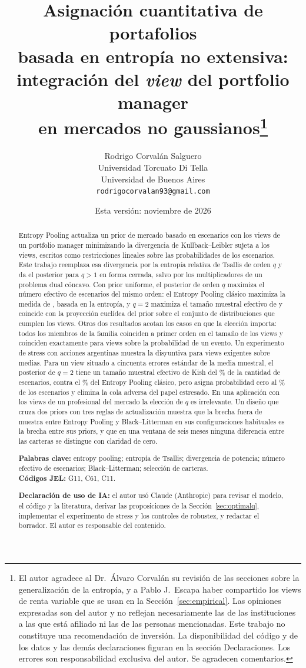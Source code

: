 \documentclass[11pt]{article}
\title{\vspace{-1.9cm}\textbf{Asignaci\'on cuantitativa de portafolios\\ basada en entrop\'ia no extensiva:\\ integraci\'on del \emph{view} del portfolio manager\\ en mercados no gaussianos}\thanks{El autor agradece al Dr.~\'Alvaro Corval\'an su revisi\'on de las secciones sobre la generalizaci\'on de la entrop\'ia, y a Pablo J.~Escapa haber compartido los views de renta variable que se usan en la Secci\'on~\ref{sec:empirical}. Las opiniones expresadas son del autor y no reflejan necesariamente las de las instituciones a las que est\'a afiliado ni las de las personas mencionadas. Este trabajo no constituye una recomendaci\'on de inversi\'on. La disponibilidad del c\'odigo y de los datos y las dem\'as declaraciones figuran en la secci\'on Declaraciones. Los errores son responsabilidad exclusiva del autor. Se agradecen comentarios.}}
\author{Rodrigo Corval\'an Salguero\\ \small Universidad Torcuato Di Tella\\ \small Universidad de Buenos Aires\\ \small \texttt{rodrigocorvalan93@gmail.com}}
\date{Esta versi\'on: noviembre de 2026}
\begin{document}
\maketitle

\begin{abstract}
\noindent
Entropy Pooling \citep{Meucci2008} actualiza un prior de mercado basado en
escenarios con los views de un portfolio manager minimizando la divergencia
de Kullback--Leibler sujeta a los views, escritos como restricciones
lineales sobre las probabilidades de los escenarios. Este trabajo reemplaza
esa divergencia por la entrop\'ia relativa de Tsallis de orden $q$ y da
el posterior para $q>1$ en forma cerrada, salvo por los multiplicadores de un
problema dual c\'oncavo. Con prior uniforme, el
posterior de orden $q$ maximiza el n\'umero efectivo de escenarios del mismo
orden: el Entropy Pooling cl\'asico maximiza la medida de \citet{Meucci2012}, basada en
la entrop\'ia, y $q=2$ maximiza el tama\~no muestral efectivo de
\citet{Kish1965} y coincide con la proyecci\'on eucl\'idea del prior sobre el
conjunto de distribuciones que cumplen los views. Otros dos resultados
acotan los casos en que la elecci\'on importa: todos los miembros de la familia
coinciden a primer orden en el tama\~no de los views y coinciden exactamente
para views sobre la probabilidad de un evento. Un experimento de stress con
acciones argentinas muestra la disyuntiva para views exigentes sobre
medias. Para un view situado a cincuenta errores est\'andar de la media
muestral, el posterior de $q=2$ tiene un tama\~no muestral efectivo de Kish del
\nKishTFiftyPct\% de la cantidad de escenarios, contra el
\nKishSFiftyPct\% del Entropy Pooling cl\'asico, pero
asigna probabilidad cero al \nZerosFiftyPct\% de los escenarios y elimina la
cola adversa del papel estresado. En una aplicaci\'on con los views de un
profesional del mercado la elecci\'on de $q$ es irrelevante. Un dise\~no que
cruza dos priors con tres reglas de actualizaci\'on muestra que la brecha
fuera de muestra entre Entropy Pooling y Black--Litterman en sus
configuraciones habituales es la brecha entre sus priors, y que en una
ventana de seis meses ninguna diferencia entre las carteras se distingue
con claridad de cero.
\medskip

\noindent\textbf{Palabras clave:} entropy pooling; entrop\'ia de Tsallis;
divergencia de potencia; n\'umero efectivo de escenarios; Black--Litterman;
selecci\'on de carteras.\\
\textbf{C\'odigos JEL:} G11, C61, C11.
\medskip

\noindent\textbf{Declaraci\'on de uso de IA:} el autor us\'o Claude
(Anthropic) para revisar el modelo, el c\'odigo y la literatura, derivar las
proposiciones de la Secci\'on~\ref{sec:optimalq}, implementar el experimento
de stress y los controles de robustez, y redactar el borrador. El autor es
responsable del contenido.
\end{abstract}
\end{document}
